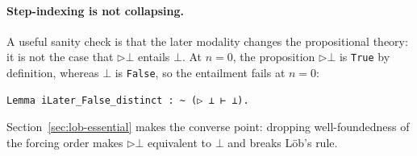 \paragraph{Step-indexing is not collapsing.}
A useful sanity check is that the later modality changes the
propositional theory: it is not the case that
$\triangleright \bot$ entails $\bot$.  At $n = 0$, the proposition
$\triangleright \bot$ is \texttt{True} by definition, whereas $\bot$
is \texttt{False}, so the entailment fails at $n = 0$:

\begin{lstlisting}
Lemma iLater_False_distinct : ~ (▷ ⊥ ⊢ ⊥).
\end{lstlisting}

\noindent
Section~\ref{sec:lob-essential} makes the converse point: dropping
well-foundedness of the forcing order makes $\triangleright \bot$
equivalent to $\bot$ and breaks Löb's rule.

